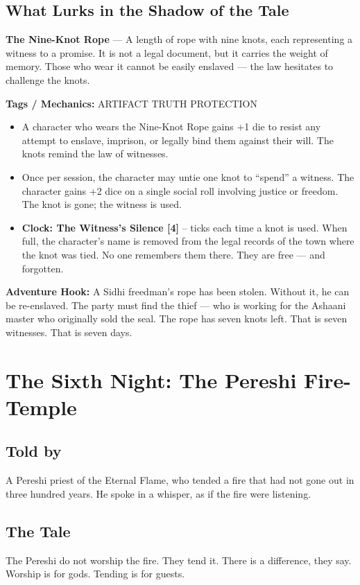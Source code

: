 \documentclass[10pt,twoside]{book}
\newcommand{\tag}[1]{\textsc{#1}}
\begin{document}
\section*{What Lurks in the Shadow of the Tale}
\begin{infobox}
\textbf{The Nine-Knot Rope} --- A length of rope with nine knots, each representing a witness to a promise. It is not a legal document, but it carries the weight of memory. Those who wear it cannot be easily enslaved --- the law hesitates to challenge the knots.

\textbf{Tags / Mechanics:} \tag{ARTIFACT} \tag{TRUTH} \tag{PROTECTION}

\begin{itemize}
\item A character who wears the Nine-Knot Rope gains +1 die to resist any attempt to enslave, imprison, or legally bind them against their will. The knots remind the law of witnesses.
\item Once per session, the character may untie one knot to ``spend'' a witness. The character gains +2 dice on a single social roll involving justice or freedom. The knot is gone; the witness is used.
\item \textbf{Clock: The Witness's Silence [4]} -- ticks each time a knot is used. When full, the character's name is removed from the legal records of the town where the knot was tied. No one remembers them there. They are free --- and forgotten.
\end{itemize}

\textbf{Adventure Hook:} A Sidhi freedman's rope has been stolen. Without it, he can be re-enslaved. The party must find the thief --- who is working for the Ashaani master who originally sold the seal. The rope has seven knots left. That is seven witnesses. That is seven days.
\end{infobox}

\chapter{The Sixth Night: The Pereshi Fire-Temple}

\section*{Told by}
A Pereshi priest of the Eternal Flame, who tended a fire that had not gone out in three hundred years. He spoke in a whisper, as if the fire were listening.

\section*{The Tale}
The Pereshi do not worship the fire. They tend it. There is a difference, they say. Worship is for gods. Tending is for guests.
\end{document}
